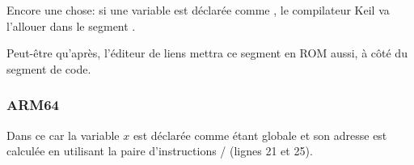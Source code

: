 Encore une chose: si une variable est déclarée comme , le compilateur
Keil va l'allouer dans le segment .

Peut-être qu'après, l'éditeur de liens mettra ce segment en ROM aussi, à côté du segment de code.

\subsubsection{ARM64}




Dans ce car la variable $x$ est déclarée comme étant globale et son adresse est
calculée en utilisant la paire d'instructions / (lignes 21 et 25).

